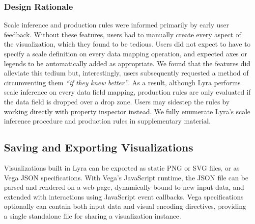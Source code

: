 \subsubsection{Design Rationale}

Scale inference and production rules were informed primarily by early user
feedback. Without these features, users had to manually create every aspect of
the visualization, which they found to be tedious. Users did not expect to have
to specify a scale definition on every data mapping operation, and expected axes
or legends to be automatically added as appropriate. We found that the features
did alleviate this tedium but, interestingly, users subsequently requested a
method of circumventing them \emph{``if they knew better''}. As a result,
although Lyra performs scale inference on every data field mapping, production
rules are only evaluated if the data field is dropped over a drop zone. Users
may sidestep the rules by working directly with property inspector instead. We
fully enumerate Lyra's scale inference procedure and production rules in
supplementary material.

\subsection{Saving and Exporting Visualizations}

Visualizations built in Lyra can be exported as static PNG or SVG files, or as
Vega JSON specifications. With Vega's JavaScript runtime, the JSON file can be
parsed and rendered on a web page, dynamically bound to new input data, and
extended with interactions using JavaScript event callbacks. Vega specifications
optionally can contain both input data and visual encoding directives, providing
a single standalone file for sharing a visualization instance.